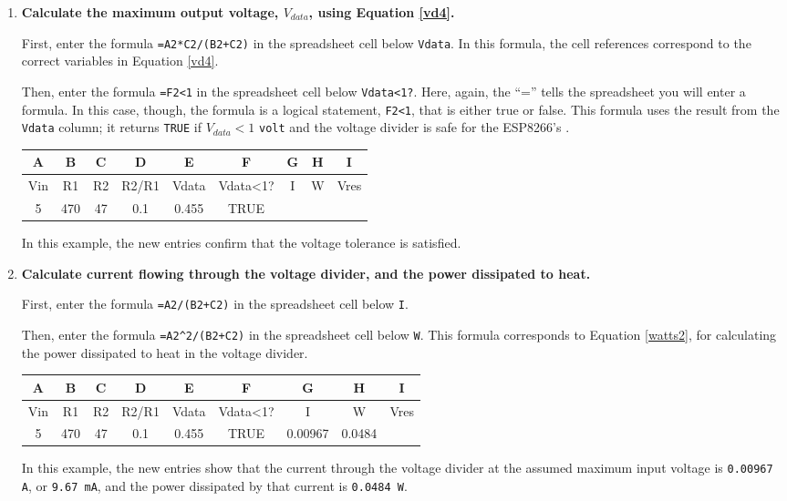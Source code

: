 \begin{enumerate}
	\item \textbf{Calculate the maximum output voltage, $V_{data}$, using Equation \ref{vd4}.}

	First, enter the formula \lstinline{=A2*C2/(B2+C2)} in the spreadsheet cell below \texttt{Vdata}.
	In this formula, the cell references correspond to the correct variables in Equation \ref{vd4}.

	Then, enter the formula \lstinline{=F2<1} in the spreadsheet cell below \texttt{Vdata<1?}.
	Here, again, the  ``='' tells the spreadsheet you will enter a formula.
	In this case, though, the formula is a logical statement, \lstinline{F2<1}, that is either true or false.
	This formula uses the result from the \texttt{Vdata} column; it returns \texttt{TRUE} if $V_{data} < 1$ \texttt{volt} and the voltage divider is safe for the ESP8266's \adc.
	\begin{table}[H]
	\centering \begin{small}
	\begin{tabular}{|c|c|c|c|c|c|c|c|c|}
		\hline
		\textbf{A}  & \textbf{B} & \textbf{C} & \textbf{D} & \textbf{E} & \textbf{F} & \textbf{G} & \textbf{H} & \textbf{I} \\
		\hline
		Vin  & R1 & R2 & R2/R1 & Vdata & Vdata<1? & I & W & Vres \\
		\hline
		5 & 470  & 47 & 0.1 & 0.455 & TRUE &  &  &  \\
		\hline
	\end{tabular}
	\end{small}
	\end{table}
	In this example, the new entries confirm that the voltage tolerance is satisfied.

	\item \textbf{Calculate current flowing through the voltage divider, and the power dissipated to heat.}

	First, enter the formula \lstinline{=A2/(B2+C2)} in the spreadsheet cell below \texttt{I}.

	Then, enter the formula \lstinline{=A2^2/(B2+C2)} in the spreadsheet cell below \texttt{W}.
	This formula corresponds to Equation \ref{watts2}, for calculating the power dissipated to heat in the voltage divider.
	\begin{table}[H]
	\centering \begin{small}
	\begin{tabular}{|c|c|c|c|c|c|c|c|c|}
		\hline
		\textbf{A}  & \textbf{B} & \textbf{C} & \textbf{D} & \textbf{E} & \textbf{F} & \textbf{G} & \textbf{H} & \textbf{I} \\
		\hline
		Vin  & R1 & R2 & R2/R1 & Vdata & Vdata<1? & I & W & Vres \\
		\hline
		5 & 470  & 47 & 0.1 & 0.455 & TRUE & 0.00967 & 0.0484 &  \\
		\hline
	\end{tabular}
	\end{small}
	\end{table}
	In this example, the new entries show that the current through the voltage divider at the assumed maximum input voltage is \texttt{0.00967 A}, or \texttt{9.67 mA}, and the power dissipated by that current is \texttt{0.0484 W}.


\end{enumerate}
